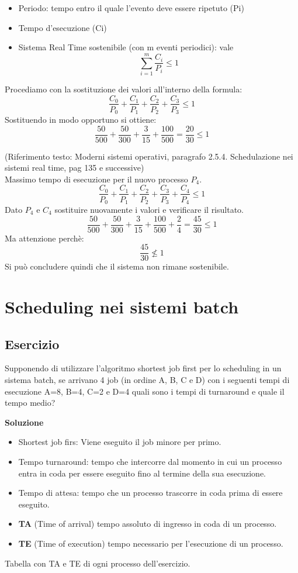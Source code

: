 \documentclass{article}
\begin{document}
\begin{itemize}
\item Periodo: tempo entro il quale l’evento deve essere ripetuto (Pi)
\item Tempo d’esecuzione (Ci)
\item Sistema Real Time sostenibile (con m eventi periodici): vale \[\sum_{i=1}^m \frac{C_i}{P_i} \le 1\]

\end{itemize}

Procediamo con la sostituzione dei valori all’interno della formula:
 \[ \frac{C_0}{P_0}+\frac{C_1}{P_1}+\frac{C_2}{P_2}+\frac{C_3}{P_3} \le 1\]
 Sostituendo in modo opportuno si ottiene:
 \[ \frac{50}{500}+\frac{50}{300}+\frac{3}{15}+\frac{100}{500} = \frac{20}{30} \le 1\]

(Riferimento testo: Moderni sistemi operativi, paragrafo 2.5.4. Schedulazione nei sistemi
real time, pag 135 e successive)\\

Massimo tempo di esecuzione per il nuovo processo $P_{4}$.
 \[ \frac{C_0}{P_0}+\frac{C_1}{P_1}+\frac{C_2}{P_2}+\frac{C_3}{P_3}+\frac{C_4}{P_4} \le 1\]
Dato  $P_{4}$ e  $C_{4}$ sostituire nuovamente i valori e verificare il risultato.
 \[ \frac{50}{500}+\frac{50}{300}+\frac{3}{15}+\frac{100}{500}+\frac{2}{4} = \frac{45}{30} \le 1\]
Ma attenzione perchè:
 \[  \frac{45}{30} \not\le 1\]
Si può concludere quindi che il sistema non rimane sostenibile.



\section{Scheduling nei sistemi batch}
\subsection{Esercizio}

Supponendo di utilizzare l’algoritmo shortest job first per
lo scheduling in un sistema batch, se arrivano 4 job (in ordine A, B,
C e D) con i seguenti tempi di esecuzione A=8, B=4, C=2 e D=4 quali
sono i tempi di turnaround e quale il tempo medio?

\vskip 0.5cm
\textbf{Soluzione}\\
\begin{itemize}
\item  Shortest job firs: Viene eseguito il job minore per primo.
\item  Tempo turnaround: tempo che intercorre dal momento in cui un processo entra in coda per essere eseguito fino al termine della sua esecuzione.
\item Tempo di attesa: tempo che un processo trascorre in coda prima di essere eseguito.
\item  \textbf{TA}  (Time of arrival)  tempo assoluto di ingresso in coda di un processo.
\item  \textbf{TE}  (Time of execution) tempo necessario per l’esecuzione di un processo.
\end{itemize}
Tabella con TA e TE di ogni processo dell’esercizio.
\end{document}
